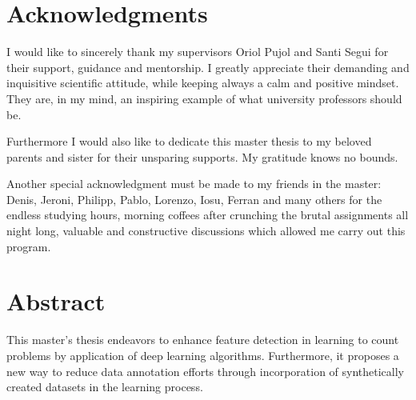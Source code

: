 \documentclass[11pt, oneside]{book}
\begin{document}
%
%
%
\setcounter{page}{3}

\thispagestyle{empty}

\thispagestyle{empty}
\chapter*{Acknowledgments}
\thispagestyle{empty}

I would like to sincerely thank my supervisors Oriol Pujol and Santi Segui for their support, guidance and mentorship. I greatly appreciate their demanding and inquisitive scientific attitude, while keeping always a calm and positive mindset. They are, in my mind, an inspiring example of what university professors should be.

Furthermore I would also like to dedicate this master thesis to my beloved parents and sister for their unsparing supports. My gratitude knows no bounds.

Another special acknowledgment must be made to my friends in the master: Denis, Jeroni, Philipp, Pablo, Lorenzo, Iosu, Ferran and many others for the endless studying hours, morning coffees after crunching the brutal assignments all night long, valuable and constructive discussions which allowed me carry out this program. 
 



\setcounter{page}{0}
\clearpage

\newpage
{} %
\chapter*{Abstract}
\thispagestyle{empty}

This master's thesis endeavors to enhance feature detection in learning to count problems by application of deep learning algorithms. Furthermore, it proposes a new way to reduce data annotation efforts through incorporation of synthetically created datasets in the learning process. 
\end{document}
